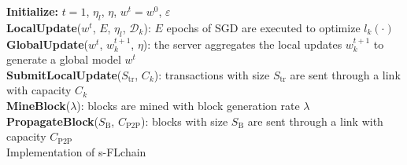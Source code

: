 \documentclass[lettersize,journal]{IEEEtran}
\begin{document}
\begin{algorithm}[ht!]	
	\SetAlgoLined
	\textbf{Initialize:} $t=1$, $\eta_l$, $\eta$, $w^t = w^0$, $\varepsilon$\\
	\textbf{LocalUpdate}($w^t$, $E$, $\eta_l$, $\mathcal{D}_k$): $E$ epochs of SGD are executed to optimize $l_k(\cdot)$\\
	\textbf{GlobalUpdate}($w^t$, $w_k^{t+1}$, $\eta$): the server aggregates the local updates $w_k^{t+1}$ to generate a global model $w^t$ \\
	\textbf{SubmitLocalUpdate}($S_\text{tr}$, $C^{}_k$): transactions with size $S_\text{tr}$ are sent through a link with capacity $C^{}_k$\\
	\textbf{MineBlock}($\lambda$): blocks are mined with block generation rate $\lambda$\\
	\textbf{PropagateBlock}($S_\text{B}$, $C_\text{P2P}$): blocks with size $S_\text{B}$ are sent through a link with capacity $C_\text{P2P}$\\
	\caption{Implementation of s-FLchain}
	\label{alg:sflchain}			
\end{algorithm}
\end{document}
